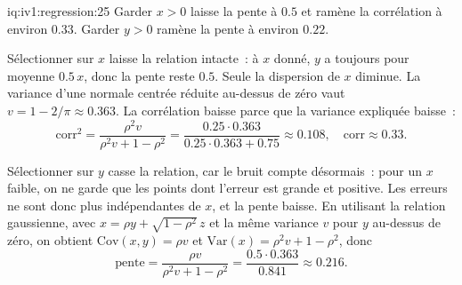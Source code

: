 \begin{solution}{iq:iv1:regression:25}
Garder $x > 0$ laisse la pente à $0.5$ et ramène la corrélation à environ $0.33$. Garder $y > 0$ ramène la pente à environ $0.22$.

Sélectionner sur $x$ laisse la relation intacte~: à $x$ donné, $y$ a toujours pour moyenne $0.5\,x$, donc la pente reste $0.5$. Seule la dispersion de $x$ diminue. La variance d'une normale centrée réduite au-dessus de zéro vaut $v = 1 - 2/\pi \approx 0.363$. La corrélation baisse parce que la variance expliquée baisse~:
\[
\text{corr}^2 = \frac{\rho^2 v}{\rho^2 v + 1 - \rho^2} = \frac{0.25 \cdot 0.363}{0.25 \cdot 0.363 + 0.75} \approx 0.108, \quad \text{corr} \approx 0.33.
\]

Sélectionner sur $y$ casse la relation, car le bruit compte désormais~: pour un $x$ faible, on ne garde que les points dont l'erreur est grande et positive. Les erreurs ne sont donc plus indépendantes de $x$, et la pente baisse. En utilisant la relation gaussienne, avec $x = \rho y + \sqrt{1 - \rho^2}\,z$ et la même variance $v$ pour $y$ au-dessus de zéro, on obtient $\mathrm{Cov}(x,y) = \rho v$ et $\mathrm{Var}(x) = \rho^2 v + 1 - \rho^2$, donc
\[
\text{pente} = \frac{\rho v}{\rho^2 v + 1 - \rho^2} = \frac{0.5 \cdot 0.363}{0.841} \approx 0.216.
\]

\end{solution}

